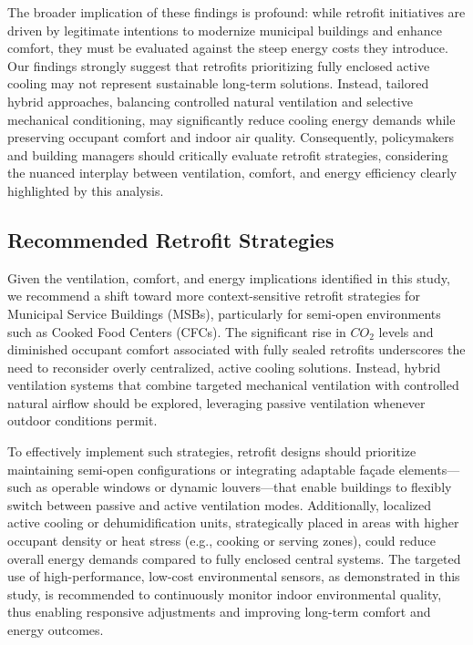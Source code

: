 \documentclass[preprint,12pt]{elsarticle}
\begin{document}
The broader implication of these findings is profound: while retrofit initiatives are driven by legitimate intentions to modernize municipal buildings and enhance comfort, they must be evaluated against the steep energy costs they introduce. Our findings strongly suggest that retrofits prioritizing fully enclosed active cooling may not represent sustainable long-term solutions. Instead, tailored hybrid approaches, balancing controlled natural ventilation and selective mechanical conditioning, may significantly reduce cooling energy demands while preserving occupant comfort and indoor air quality. Consequently, policymakers and building managers should critically evaluate retrofit strategies, considering the nuanced interplay between ventilation, comfort, and energy efficiency clearly highlighted by this analysis.




\subsection{Recommended Retrofit Strategies}
Given the ventilation, comfort, and energy implications identified in this study, we recommend a shift toward more context-sensitive retrofit strategies for Municipal Service Buildings (MSBs), particularly for semi-open environments such as Cooked Food Centers (CFCs). The significant rise in $CO_2$ levels and diminished occupant comfort associated with fully sealed retrofits underscores the need to reconsider overly centralized, active cooling solutions. Instead, hybrid ventilation systems that combine targeted mechanical ventilation with controlled natural airflow should be explored, leveraging passive ventilation whenever outdoor conditions permit.

To effectively implement such strategies, retrofit designs should prioritize maintaining semi-open configurations or integrating adaptable façade elements—such as operable windows or dynamic louvers—that enable buildings to flexibly switch between passive and active ventilation modes. Additionally, localized active cooling or dehumidification units, strategically placed in areas with higher occupant density or heat stress (e.g., cooking or serving zones), could reduce overall energy demands compared to fully enclosed central systems. The targeted use of high-performance, low-cost environmental sensors, as demonstrated in this study, is recommended to continuously monitor indoor environmental quality, thus enabling responsive adjustments and improving long-term comfort and energy outcomes.
\end{document}
